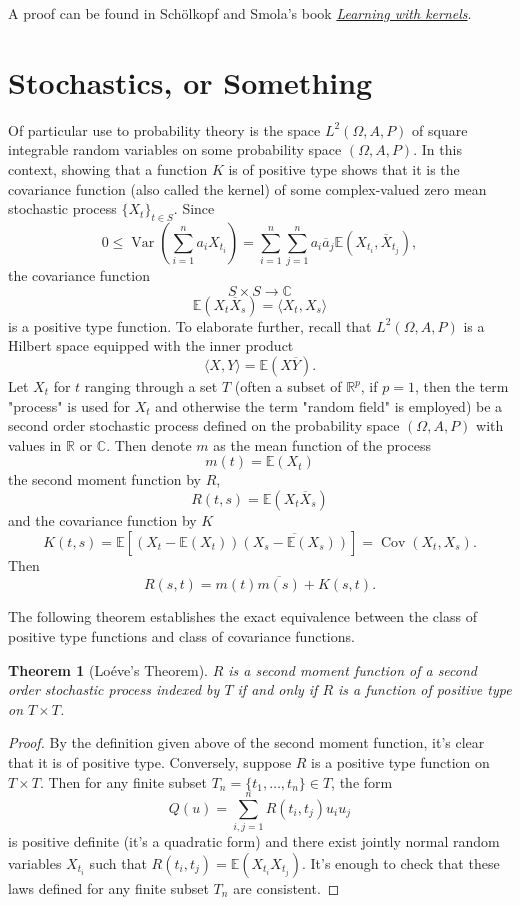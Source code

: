 \documentclass[psamsfonts]{amsart}
\newtheorem{thm}{Theorem}[section]
\theoremstyle{definition}
\theoremstyle{remark}
\DeclareMathOperator{\Var}{Var}
\DeclareMathOperator{\Cov}{Cov}
\numberwithin{equation}{section}
\begin{document}
A proof can be found in Sch\"{o}lkopf and Smola's book \href{https://mitpress.mit.edu/books/learning-kernels}{\textit{Learning with kernels}}.

\section{Stochastics, or Something}
Of particular use to probability theory is the space $L^2(\Omega, A, P)$ of square integrable random variables on some probability space $(\Omega, A, P)$. In this context, showing that a function $K$ is of positive type shows that it is the covariance function (also called the kernel) of some complex-valued zero mean stochastic process $\{ X_t \} _{t \in S}$. Since 
$$0 \leq \Var \left( \sum _{i = 1} ^n a_i X_{t_i} \right) = \sum ^n _{i = 1} \sum ^n _{j = 1} a_i \overline{a}_j \mathbb{E} (X_{t_i}, \overline{X}_{t_j} ),  $$
the covariance function 
$$S \times S \rightarrow \mathbb{C} $$
$$\mathbb{E} (X_t \overline{X} _s) = \langle X_t, X_s \rangle  $$
is a positive type function. To elaborate further, recall that $L^2(\Omega, A, P)$ is a Hilbert space equipped with the inner product 
$$\langle X, Y \rangle = \mathbb{E}(X\overline{Y}). $$
Let $X_t$ for $t$ ranging through a set $T$ (often a subset of $\mathbb{R}^p$, if $p = 1$, then the term "process" is used for $X_t$ and otherwise the term "random field" is employed) be a second order stochastic process defined on the probability space $(\Omega, A, P)$ with values in $\mathbb{R}$ or $\mathbb{C}$. Then denote $m$ as the mean function of the process 
$$m(t) = \mathbb{E} (X_t) $$
the second moment function by $R$, 
$$R(t, s) = \mathbb{E} (X_t \overline{X}_s) $$
and the covariance function by $K$ 
$$K(t, s) = \mathbb{E} [(X_t - \mathbb{E}(X_t)) \overline{(X_s - \mathbb{E}(X_s))}]= \Cov(X_t, X_s). $$
Then 
$$R(s, t) = m(t) \overline{m(s)} + K(s,t). $$

The following theorem establishes the exact equivalence between the class of positive type functions and class of covariance functions. 

\begin{thm}[Lo\'{e}ve's Theorem]
$R$ is a second moment function of a second order stochastic process indexed by $T$ if and only if $R$ is a function of positive type on $T \times T$.
\end{thm}

\begin{proof}
By the definition given above of the second moment function, it's clear that it is of positive type. Conversely, suppose $R$ is a positive type function on $T \times T$. Then for any finite subset $T_n = \{ t_1, \dots, t_n \} \in T$, the form 
$$Q(u) = \sum _{i, j = 1} ^n R(t_i, t_j) u_i u_j $$
is positive definite (it's a quadratic form) and there exist jointly normal random variables $X_{t_i}$ such that $R(t_i, t_j) = \mathbb{E} (X_{t_i} X_{t_j}).$ It's enough to check that these laws defined for any finite subset $T_n$ are consistent. 
\end{proof}
\end{document}
